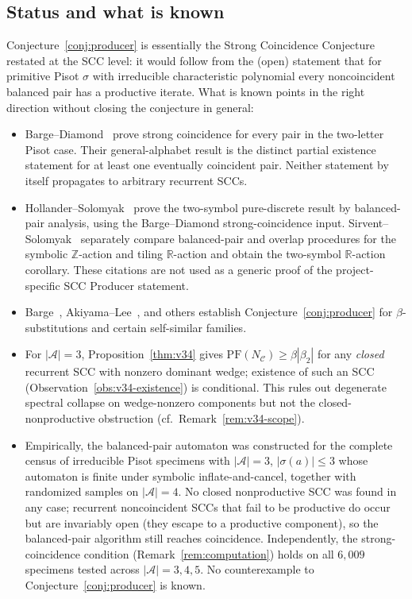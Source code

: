 \documentclass[11pt]{article}
\theoremstyle{plain}
\theoremstyle{definition}
\theoremstyle{remark}
\newcommand{\A}{\mathcal{A}}
\newcommand{\C}{\mathcal{C}}
\newcommand{\PFroot}{\mathrm{PF}}
\begin{document}
\subsection{Status and what is known}\label{sec:status-known}

Conjecture~\ref{conj:producer} is essentially the Strong Coincidence Conjecture restated at the SCC level: it would follow from the (open) statement that for primitive Pisot $\sigma$ with irreducible characteristic polynomial every noncoincident balanced pair has a productive iterate. What is known points in the right direction without closing the conjecture in general:
\begin{itemize}[leftmargin=*]
\item Barge--Diamond~\cite{BD} prove strong coincidence for every pair in the two-letter Pisot case. Their general-alphabet result is the distinct partial existence statement for at least one eventually coincident pair. Neither statement by itself propagates to arbitrary recurrent SCCs.
\item Hollander--Solomyak~\cite{HS} prove the two-symbol pure-discrete result by balanced-pair analysis, using the Barge--Diamond strong-coincidence input. Sirvent--Solomyak~\cite{SS} separately compare balanced-pair and overlap procedures for the symbolic $\mathbb Z$-action and tiling $\mathbb R$-action and obtain the two-symbol $\mathbb R$-action corollary. These citations are not used as a generic proof of the project-specific SCC Producer statement.
\item Barge~\cite{Barge2018}, Akiyama--Lee~\cite{AL}, and others establish Conjecture~\ref{conj:producer} for $\beta$-substitutions and certain self-similar families.
\item For $|\A|=3$, Proposition~\ref{thm:v34} gives $\PFroot(N_\C)\ge\beta|\beta_2|$ for any \emph{closed} recurrent SCC with nonzero dominant wedge; existence of such an SCC (Observation~\ref{obs:v34-existence}) is conditional. This rules out degenerate spectral collapse on wedge-nonzero components but not the closed-nonproductive obstruction (cf.\ Remark~\ref{rem:v34-scope}).
\item Empirically, the balanced-pair automaton was constructed for the complete census of irreducible Pisot specimens with $|\A|=3$, $|\sigma(a)|\le 3$ whose automaton is finite under symbolic inflate-and-cancel, together with randomized samples on $|\A|=4$. No closed nonproductive SCC was found in any case; recurrent noncoincident SCCs that fail to be productive do occur but are invariably open (they escape to a productive component), so the balanced-pair algorithm still reaches coincidence. Independently, the strong-coincidence condition (Remark~\ref{rem:computation}) holds on all $6{,}009$ specimens tested across $|\A|=3,4,5$. No counterexample to Conjecture~\ref{conj:producer} is known.

\end{itemize}
\end{document}
